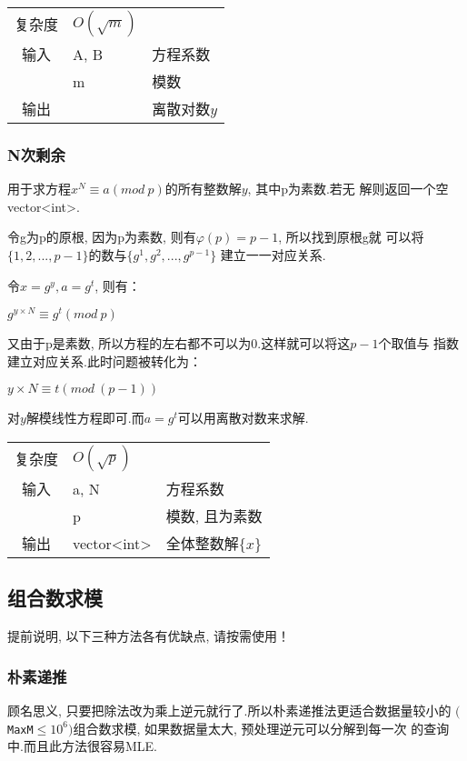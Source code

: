 \begin{longtable}{|c|l|l|}
复杂度 & $O(\sqrt{m})$ &  \\
输入 & A, B & 方程系数 \\
 & m & 模数\\
输出 &  & 离散对数$y$ \\
\end{longtable}



        \subsubsection{N次剩余}\small
用于求方程$x^{N} \equiv a(mod\ p)$的所有整数解$y$, 其中p为素数.若无
解则返回一个空vector<int>.

令g为p的原根, 因为p为素数, 则有$\varphi(p) = p - 1$, 所以找到原根g就
可以将$\{1, 2, ..., p - 1\}$的数与$\{g^{1}, g^{2}, ..., g^{p - 1}\}$
建立一一对应关系.

令$x = g^{y}, a = g^{t}$, 则有：

$g^{y \times N} \equiv g^{t} (mod\ p)$

又由于p是素数, 所以方程的左右都不可以为0.这样就可以将这$p-1$个取值与
指数建立对应关系.此时问题被转化为：

$y \times N \equiv t (mod\ (p-1))$

对$y$解模线性方程即可.而$a = g^{t}$可以用离散对数来求解.

\begin{longtable}{|c|l|l|}
复杂度 & $O(\sqrt{p})$ &  \\
输入 & a, N & 方程系数 \\
 & p & 模数, 且为素数 \\
输出 & vector<int> & 全体整数解$\{x\}$ \\
\end{longtable}



    \subsection{组合数求模}\small
提前说明, 以下三种方法各有优缺点, 请按需使用！


        \subsubsection{朴素递推}\small
顾名思义, 只要把除法改为乘上逆元就行了.所以朴素递推法更适合数据量较小的
$(${\tt MaxM}$ \leq 10^6)$组合数求模, 如果数据量太大, 预处理逆元可以分解到每一次
的查询中.而且此方法很容易MLE.

